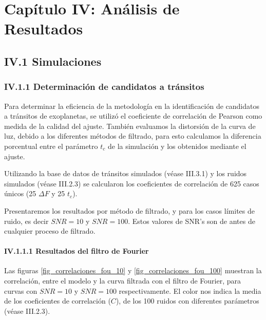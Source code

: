 \chapter*{\textbf{Capítulo IV: Análisis de Resultados}}
\label{ch:Resultados}
\setcounter{chapter}{4}
\setcounter{equation}{0}
\setcounter{figure}{0}
\setcounter{table}{0}

\section*{IV.1 Simulaciones}

\subsection*{IV.1.1 Determinación de candidatos a tránsitos}

Para determinar la eficiencia de la metodología en la identificación de candidatos a tránsitos de exoplanetas, se utilizó el coeficiente de correlación de Pearson como medida de la calidad del ajuste. También evaluamos la distorsión de la curva de luz, debido a los diferentes métodos de filtrado, para esto calculamos la diferencia porcentual entre el parámetro $t_c$ de la simulación y los obtenidos mediante el ajuste.

Utilizando la base de datos de tránsitos simulados (véase III.3.1) y los ruidos simulados (véase III.2.3) se calcularon los coeficientes de correlación de 625 casos únicos (25 $\Delta F$ y 25 $t_{c}$).

Presentaremos los resultados por método de filtrado, y para los casos límites de ruido, es decir $SNR=10$ y $SNR=100$. Estos valores de SNR's son de antes de cualquier proceso de filtrado.

\subsubsection*{IV.1.1.1 Resultados del filtro de Fourier}

Las figuras \ref{fig_correlaciones_fou_10} y \ref{fig_correlaciones_fou_100} muestran la correlación, entre el modelo y la curva filtrada con el filtro de Fourier, para curvas con $SNR=10$ y $SNR=100$ respectivamente. El color nos indica la media de los coeficientes de correlación ($C$), de los 100 ruidos con diferentes parámetros (véase III.2.3).

